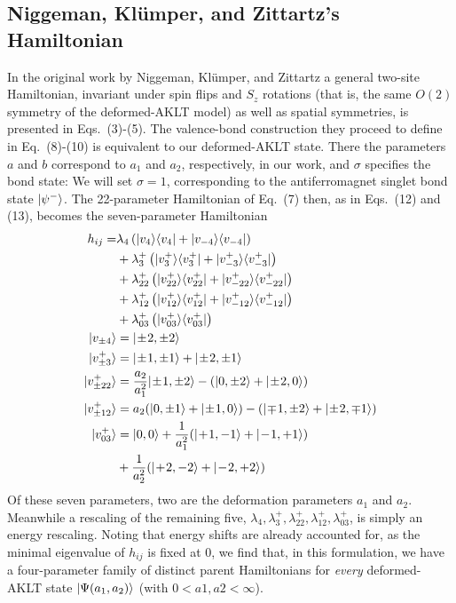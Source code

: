 \documentclass[aps,prb,letterpaper,superscriptaddress,twocolumn,showpacs,floatfix,10pt]{revtex4-1}
\begin{document}
\subsection{Niggeman, Kl\"umper, and Zittartz's Hamiltonian}
\label{app:NKZ}
In the original work by Niggeman, Kl\"umper, and Zittartz\cite{NKZspin2} a
general two-site Hamiltonian, invariant under spin flips and $S_z$ rotations
(that is, the same $O(2)$ symmetry of the deformed-AKLT model) as well as
spatial symmetries, is presented in Eqs.~(3)-(5). The valence-bond construction
they proceed to define in Eq.~(8)-(10) is equivalent to our deformed-AKLT state.
There the parameters $a$ and $b$ correspond to $a_1$ and $a_2$, respectively,
in our work, and $\sigma$ specifies the bond state: We will set $\sigma=1$,
corresponding to the antiferromagnet singlet bond state $\vert\psi^-\rangle$.
The 22-parameter Hamiltonian of Eq.~(7) then, as in Eqs.~(12) and (13),
becomes the seven-parameter Hamiltonian
\begin{align}
\label{eq:NKZham}
h_{ij} =& \lambda_4\left(\ket{v_4}\bra{v_4}+\ket{v_{-4}}\bra{v_{-4}}\right)\notag\\
&+\lambda_3^+\left(\ket{v_3^+}\bra{v_3^+}+\ket{v_{-3}^+}\bra{v_{-3}^+}\right)\notag\\
&+\lambda_{22}^+\left(\ket{v_{22}^+}\bra{v_{22}^+}+\ket{v_{-22}^+}\bra{v_{-22}^+}\right)\notag\\
&+\lambda_{12}^+\left(\ket{v_{12}^+}\bra{v_{12}^+}+\ket{v_{-12}^+}\bra{v_{-12}^+}\right)\notag\\
&+\lambda_{03}^+\left(\ket{v_{03}^+}\bra{v_{03}^+}\right)\\
\ket{v_{\pm 4}}&=\ket{\!\pm\!2,\pm2}\\
\ket{v_{\pm 3}^+}&=\ket{\!\pm\!1,\pm1}+\ket{\!\pm\!2,\pm1}\\
\ket{v_{\pm 22}^+}&=\frac{a_2}{a_1^2}\ket{\!\pm\!1,\pm2}-(\ket{0,\pm2}+\ket{\!\pm\!2,0})\\
\ket{v_{\pm 12}^+}&=a_2(\ket{0,\pm1}+\ket{\!\pm\!1,0})-(\ket{\!\mp\!1,\pm2}+\ket{\!\pm\!2,\mp1})\\
\ket{v_{03}^+}&=\ket{0,0}+\frac{1}{a_1^2}(\ket{\!+\!1,-1}+\ket{\!-\!1,+1})\notag\\
&+\frac{1}{a_2^2}(\ket{\!+\!2,-2}+\ket{\!-\!2,+2})
\end{align}
Of these seven parameters, two are the deformation parameters $a_1$ and $a_2$.
Meanwhile a rescaling of the remaining five,
$\lambda_4,\lambda_3^+,\lambda_{22}^+,\lambda_{12}^+,\lambda_{03}^+$, is
simply an energy rescaling. Noting that energy shifts are already accounted
for, as the minimal eigenvalue of $h_{ij}$ is fixed at 0, we find that, in
this formulation, we have a four-parameter family of distinct parent
Hamiltonians for \textit{every} deformed-AKLT state $\vert\Psi(a_1,a_2)\rangle$
(with $0<a1,a2<\infty$).
\end{document}
